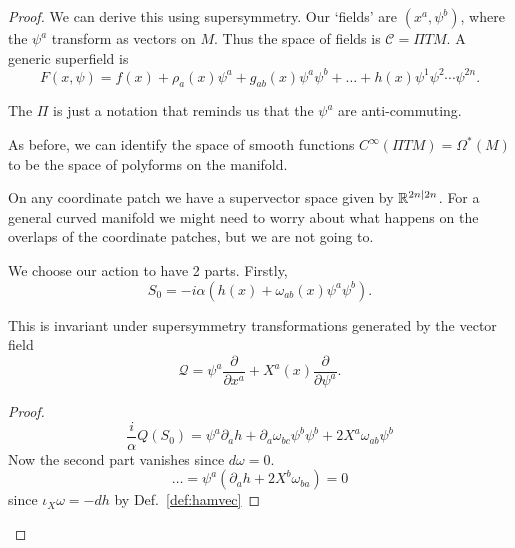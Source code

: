 \begin{proof}
  We can derive this using supersymmetry. Our `fields' are $(x^{a}, \psi^{b})$, where the $\psi^{a}$ transform as vectors on $M$. Thus the space of fields is $\mathcal{C} = \Pi TM$.
  A generic superfield is 
  \begin{equation}
    F(x, \psi) = f(x) + \rho_a(x) \psi^{a} + g_{ab} (x) \psi^{a} \psi^{b} + \dots + h(x) \psi^1 \psi^2 \cdots \psi^{2n}.
  \end{equation}
  \begin{leftbar}
    The $\Pi$ is just a notation that reminds us that the $\psi^{a}$ are anti-commuting.
  \end{leftbar}
  As before, we can identify the space of smooth functions $C^\infty (\Pi T M) = \Omega^* (M)$ to be the space of polyforms on the manifold.
  \begin{leftbar}
    On any coordinate patch we have a supervector space given by $\mathbb{R}^{2n \suchthat 2n}$.
    For a general curved manifold we might need to worry about what happens on the overlaps of the coordinate patches, but we are not going to.
  \end{leftbar}
  We choose our action to have 2 parts. Firstly,
  \begin{equation}
    S_0 = -i \alpha \left( h(x) + \omega_{ab}(x) \psi^{a} \psi^{b} \right).
  \end{equation}
  \begin{leftbar}
    \begin{claim}
      This is invariant under supersymmetry transformations generated by the vector field
      \begin{equation}
	\mathcal{Q} = \psi^{a} \frac{\partial }{\partial x^{a}} + X^{a}(x) \frac{\partial }{\partial \psi^{a}}.
      \end{equation}
    \end{claim}
    \begin{proof}
      \begin{equation}
	\frac{i}{\alpha} Q(S_0) = \psi^{a} \partial_{a} h + \partial_{a} \omega_{bc} \psi^{b} \psi^{b} + 2 X^{a} \omega_{ab} \psi^{b}
      \end{equation}
      Now the second part vanishes since $d\omega = 0$.
      \begin{equation}
	\dots = \psi^{a} (\partial_{a} h + 2 X^{b} \omega_{ba}) = 0
      \end{equation}
      since $\iota_X \omega = - dh$ by Def.~\ref{def:hamvec}
    \end{proof}
  \end{leftbar}

\end{proof}
